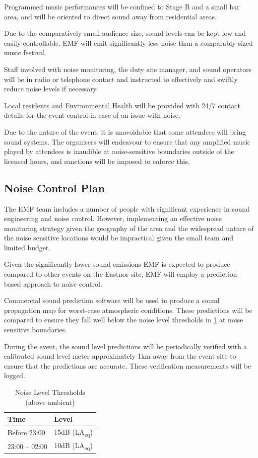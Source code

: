 Programmed music performances will be confined to Stage B and a
small bar area, and will be oriented to direct sound away from residential areas.

Due to the comparatively small audience size, sound levels can be kept low and
easily controllable. EMF will emit significantly less noise than a comparably-sized
music festival.

Staff involved with noise monitoring, the duty site manager, and sound operators
will be in radio or telephone contact and instructed to effectively and swiftly
reduce noise levels if necessary.

Local residents and Environmental Health will be provided with 24/7 contact
details for the event control in case of an issue with noise.

Due to the nature of the event, it is unavoidable that some attendees will
bring sound systems.  The organisers will endeavour to ensure that any
amplified music played by attendees is inaudible at noise-sensitive boundaries
outside of the licensed hours, and sanctions will be imposed to enforce this.

\subsection{Noise Control Plan}
The EMF team includes a number of people with significant experience in sound 
engineering and noise control. However, implementing an effective noise monitoring
strategy given the geography of the area and the widespread nature of the noise
sensitive locations would be impractical given the small team and limited budget.

Given the significantly lower sound emissions EMF is expected to produce compared to
other events on the Eastnor site, EMF will employ a prediction-based approach to
noise control.

Commercial sound prediction software \cite{noizcalc} will be used to produce a sound
propagation map for worst-case atmospheric conditions. These predictions will be compared
to ensure they fall well below the noise level thresholds in \cref{table:noisethresholds}
at noise sensitive boundaries.

During the event, the sound level predictions will be periodically verified with a
calibrated sound level meter approximately 1km away from the event site to ensure that the
predictions are accurate. These verification measurements will be logged.

\begin{table}[h!]
    \caption{Noise Level Thresholds (above ambient)}
    \label{table:noisethresholds}
    \centering
    \begin{tabular}{| l l |}
        \hline
        \textbf{Time} & \textbf{Level} \\
        \hline
        Before 23:00 & 15dB (LA\textsubscript{eq}) \\
        23:00 -- 02:00 & 10dB (LA\textsubscript{eq}) \\
        \hline
    \end{tabular}
\end{table}


